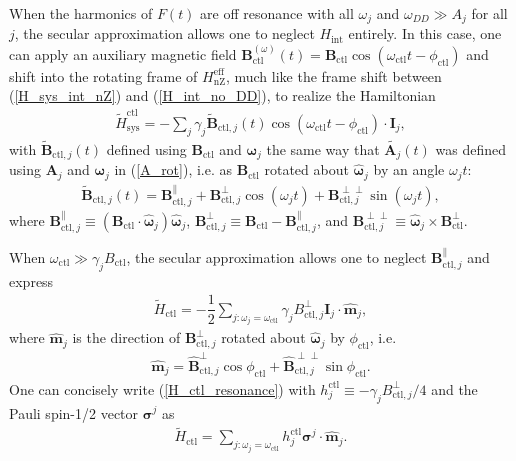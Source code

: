\documentclass[twocolumn]{revtex4}
\renewcommand{\t}{\text} %
\newcommand{\f}[2]{\dfrac{#1}{#2}} %
\newcommand{\p}[1]{\left(#1\right)} %
\renewcommand{\v}{\bm} %
\newcommand{\uv}[1]{\hat{\v{#1}}} %
\renewcommand{\c}{\cdot} %
\begin{document}
When the harmonics of $F\p{t}$ are off resonance with all $\omega_j$
and $\omega_{DD}\gg A_j$ for all $j$, the secular approximation allows
one to neglect $H_\t{int}$ entirely. In this case, one can apply an
auxiliary magnetic field
$\v B_\t{ctl}^{\p\omega}\p{t}=\v
B_\t{ctl}\cos\p{\omega_\t{ctl}t-\phi_\t{ctl}}$ and shift into the
rotating frame of $H_\t{nZ}^\t{eff}$, much like the frame shift
between (\ref{H_sys_int_nZ}) and (\ref{H_int_no_DD}), to realize the
Hamiltonian
\begin{align}
  \tilde H_\t{sys}^\t{ctl} =
  -\sum_j\gamma_j\tilde{\v B}_{\t{ctl},j}\p{t}
  \cos\p{\omega_\t{ctl}t-\phi_\t{ctl}}\c\v I_j,
\end{align}
with $\tilde{\v B}_{\t{ctl},j}\p{t}$ defined using $\v B_\t{ctl}$ and
$\v\omega_j$ the same way that $\tilde{\v A_j}\p{t}$ was defined using
$\v A_j$ and $\v\omega_j$ in (\ref{A_rot}), i.e. as $\v B_\t{ctl}$
rotated about $\uv\omega_j$ by an angle $\omega_jt$:
\begin{align}
  \tilde{\v B}_{\t{ctl},j}\p{t} = \v B_{\t{ctl},j}^\parallel
  + \v B_{\t{ctl},j}^\perp\cos\p{\omega_jt}
  + \v B_{\t{ctl},j}^{\perp\perp}\sin\p{\omega_jt},
\end{align}
where
$\v B_{\t{ctl},j}^\parallel\equiv\p{\v B_\t{ctl}
  \c\uv\omega_j}\uv\omega_j$,
$\v B_{\t{ctl},j}^\perp\equiv\v B_\t{ctl} - \v
B_{\t{ctl},j}^\parallel$, and
$\v B_{\t{ctl},j}^{\perp\perp}\equiv\uv\omega_j\times\v
B_\t{ctl}^\perp$.

When $\omega_\t{ctl}\gg\gamma_jB_\t{ctl}$, the secular approximation
allows one to neglect $\v B_{\t{ctl},j}^\parallel$ and express
\begin{align}
  \tilde H_\t{ctl} = -\f12\sum_{j:\omega_j=\omega_\t{ctl}}
  \gamma_jB_{\t{ctl},j}^\perp \v I_j\c\uv m_j,
  \label{H_ctl_resonance}
\end{align}
where $\uv m_j$ is the direction of $\v B_{\t{ctl},j}^\perp$ rotated
about $\uv\omega_j$ by $\phi_\t{ctl}$, i.e.
\begin{align}
  \uv m_j = \uv B_{\t{ctl},j}^\perp\cos\phi_\t{ctl} +
  \uv B_{\t{ctl},j}^{\perp\perp}\sin\phi_\t{ctl}.
\end{align}
One can concisely write (\ref{H_ctl_resonance}) with
$h_j^\t{ctl}\equiv-\gamma_jB_{\t{ctl},j}^\perp/4$ and the Pauli
spin-1/2 vector $\v\sigma^j$ as
\begin{align}
  \tilde H_\t{ctl} = \sum_{j:\omega_j=\omega_\t{ctl}}
  h_j^\t{ctl}\v\sigma^j\c\uv m_j.
  \label{H_ctl}
\end{align}
\end{document}
